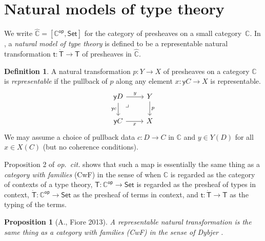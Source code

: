 \documentclass[12pt,reqno]{amsart}
\newcommand{\C}{\ensuremath{\mathbb{C}}}
\newcommand{\op}[1]{\ensuremath{{#1}^{\mathsf{op}}}}
\newcommand{\psh}[1]{\ensuremath{[\op{#1},\mathsf{Set}]}}
\newcommand{\Set}{\ensuremath{\mathsf{Set}}}
\newcommand{\y}{\ensuremath{\mathsf{y}}} %
\renewcommand{\to}{\ensuremath{\rightarrow}}
\renewcommand{\t}{\ensuremath{\mathsf{t}}}
\newcommand{\T}{\ensuremath{\mathsf{T}}}
\newcommand{\TT}{\ensuremath{\dot{\mathsf{T}}}}
\newcommand{\pbcorner}{\arrow[dr,phantom,"\lrcorner" very near start, shift right=.5ex]} %
\newtheorem{proposition}[theorem]{Proposition}
\theoremstyle{remark}
\theoremstyle{definition}
\newtheorem{definition}[theorem]{Definition}
\begin{document}
\section{Natural models of type theory}\label{sec:NaturalModels}

\noindent We write $\widehat{\C} = \psh{\C}$ for the category of presheaves on a small category~$\C$. 
In \cite{awodey:NM}, a \emph{natural model of type theory} is defined to be a representable natural transformation $\t: \TT\to \T$ of presheaves in $\widehat{\C}$.  

\begin{definition}\label{def:representablenattrans} A natural transformation $p : Y \to X$ of presheaves on a category $\C$  is \emph{representable} if the pullback of $p$ along any element $x: \y{C} \to X$ is representable.
\begin{equation*}
\begin{tikzcd}
 \y{D} \ar[d,swap,"{\y{c}}"] \ar[r,"y"] \pbcorner &  Y \ar[d, "p"]\\
\y{C} \ar[r,swap,"x"]  & X
\end{tikzcd}
\end{equation*}
We may assume a choice of pullback data $c : D \to C$ in $\C$ and $y \in Y(D)$ for all $x\in X(C)$ (but no coherence conditions).
\end{definition}

Proposition 2 of \emph{op.\ cit.} shows that such a map is essentially the same thing as a \emph{category with families} (CwF) in the sense of \cite{Dybjer:CWF} when $\C$ is regarded as the category of contexts of a type theory, $\T: \op{\C} \to \Set$ is regarded as the presheaf of types in context, $\TT: \op{\C} \to \Set$ as the presheaf of terms in context, and $\t : \TT\to\T$ as the typing of the terms.   

\begin{proposition}[A., Fiore 2013] A representable natural transformation is the same thing as a \emph{category with families (CwF)} in the sense of Dybjer \cite{Dybjer:CWF}.
\end{proposition}
\end{document}
